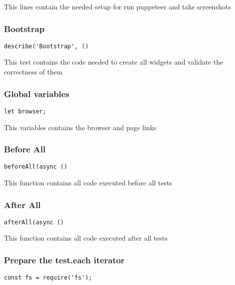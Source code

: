 \documentclass[a4paper]{article}
\begin{document}
This lines contain the needed setup for run puppeteer and take screenshots

\hypertarget{toc35}{}
\subsubsection{Bootstrap}

\begin{lstlisting}
describe('Bootstrap', ()
\end{lstlisting}

This test contains the code needed to create all widgets and validate the
correctness of them

\hypertarget{toc36}{}
\subsubsection{Global variables}

\begin{lstlisting}
let browser;
\end{lstlisting}

This variables contains the browser and page links

\hypertarget{toc37}{}
\subsubsection{Before All}

\begin{lstlisting}
beforeAll(async ()
\end{lstlisting}

This function contains all code executed before all tests

\hypertarget{toc38}{}
\subsubsection{After All}

\begin{lstlisting}
afterAll(async ()
\end{lstlisting}

This function contains all code executed after all tests

\hypertarget{toc39}{}
\subsubsection{Prepare the test.each iterator}

\begin{lstlisting}
const fs = require('fs');
\end{lstlisting}
\end{document}
